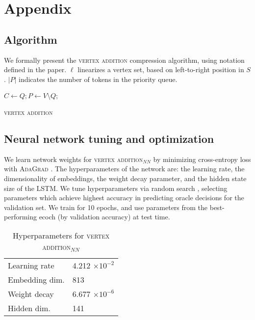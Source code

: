 \appendix

\section{Appendix}

\subsection{Algorithm}
We formally present the \textsc{vertex addition} compression algorithm, using notation defined in the paper. $\ell$ linearizes a vertex set, based on left-to-right position in $S$. $|P|$ indicates the number of tokens in the priority queue.

\begin{algorithm}[]
\SetAlgoLined
{}
 $ C \gets Q;  P \gets V \setminus Q$; \\
 \caption{\textsc{vertex addition}}
\end{algorithm}\label{a:algo}

\subsection{Neural network tuning and optimization}

We learn network weights for \textsc{vertex addition}$_{NN}$ by minimizing cross-entropy loss with \textsc{AdaGrad} \cite{duchi2011adaptive}. The hyperparameters of the network are: the learning rate, the dimensionality of embeddings, the weight decay parameter, and the hidden state size of the LSTM. We tune hyperparameters via random search \cite{Bergstra2012RandomSF}, selecting parameters which achieve highest accuracy in predicting oracle decisions for the validation set. We train for 10 epochs, and use parameters from the best-performing ecoch (by validation accuracy) at test time.

\begin{table}[htb!]
\centering
\begin{tabular}{ll}
Learning rate & 4.212 $\times 10^{-2}$ \\ 
Embedding dim. &  813  \\
Weight decay   & 6.677 $ \times 10^{-6}$ \\
Hidden dim. & 141 \\
\end{tabular}
\caption{Hyperparameters for \textsc{vertex addition}$_{NN}$}\label{t:params}
\end{table}


